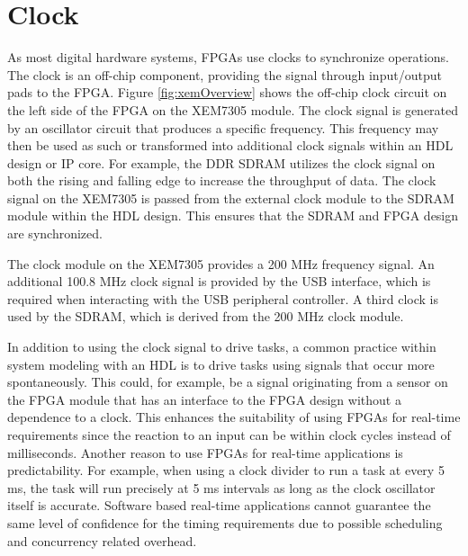 \documentclass[12pt]{report}
\begin{document}
\section{Clock}
As most digital hardware systems, FPGAs use clocks to synchronize operations. The clock is an off-chip component, providing the signal through input/output pads to the FPGA. Figure \ref{fig:xemOverview} shows the off-chip clock circuit on the left side of the FPGA on the XEM7305 module. The clock signal is generated by an oscillator circuit that produces a specific frequency. This frequency may then be used as such or transformed into additional clock signals within an HDL design or IP core. For example, the DDR SDRAM utilizes the clock signal on both the rising and falling edge to increase the throughput of data. The clock signal on the XEM7305 is passed from the external clock module to the SDRAM module within the HDL design. This ensures that the SDRAM and FPGA design are synchronized. \citep{XEM7305Man}
\par
The clock module on the XEM7305 provides a 200 MHz frequency signal. An additional 100.8 MHz clock signal is provided by the USB interface, which is required when interacting with the USB peripheral controller. A third clock is used by the SDRAM, which is derived from the 200 MHz clock module. \citep{XEM7305Man}
\par
In addition to using the clock signal to drive tasks, a common practice within system modeling with an HDL is to drive tasks using signals that occur more spontaneously. This could, for example, be a signal originating from a sensor on the FPGA module that has an interface to the FPGA design without a dependence to a clock. This enhances the suitability of using FPGAs for real-time requirements since the reaction to an input can be within clock cycles instead of milliseconds. Another reason to use FPGAs for real-time applications is predictability. For example, when using a clock divider to run a task at every 5 ms, the task will run precisely at 5 ms intervals as long as the clock oscillator itself is accurate. Software based real-time applications cannot guarantee the same level of confidence for the timing requirements due to possible scheduling and concurrency related overhead.
\end{document}
